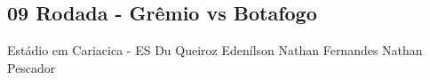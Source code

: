 \newpage
\subsection{09 Rodada - Grêmio vs Botafogo}

\begin{figure}[H]
    \centering
    
\end{figure}


Estádio em Cariacica - ES
Du Queiroz
Edenílson
Nathan Fernandes
Nathan Pescador